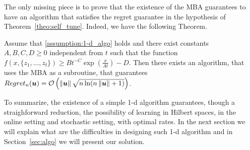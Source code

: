 The only missing piece is to prove that the existence of the \ac{MBA} guarantees to have an algorithm that satisfies the regret guarantee in the hypothesis of Theorem~\ref{theo:self_tune}. Indeed, we have the following Theorem.
\begin{theorem}
\label{theo:regret_pistol}
Assume that \ref{assumption:1-d_algo} holds and there exist constants $A,B,C,D\geq0$ independent from $t$ such that the function $f(x,\{z_1, \ldots, z_t\}) \geq B t^{-C} \exp(\frac{x}{A t})-D$.
Then there exists an algorithm, that uses the \ac{MBA} as a subroutine, that guarantees $Regret_n(\boldsymbol{u})=\mathcal{O}\left(\left\|{\boldsymbol{u}}\right\|\sqrt{n \ln(n \left\|{\boldsymbol{u}}\right\|+1)}\right)$.
\end{theorem}



To summarize, the existence of a simple 1-d algorithm guarantees, though a straighforward reduction, the possibility of learning in Hilbert spaces, in the online setting and stochastic setting, with optimal rates.
In the next section we will explain what are the difficulties in designing such 1-d algorithm and in Section~\ref{sec:algo} we will present our solution.